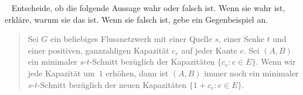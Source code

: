 \documentclass{uebung_cs}
\begin{document}
\begin{exercise}\
    Entscheide, ob die folgende Aussage wahr oder falsch ist. Wenn sie wahr ist, erkläre, warum sie das ist. Wenn sie falsch ist, gebe ein Gegenbeispiel an.
    \begin{quote}
        Sei $G$ ein beliebiges Flussnetzwerk mit einer Quelle $s$, einer Senke $t$ und einer positiven, ganzzahligen Kapazität $c_e$ auf jeder Kante $e$. Sei $(A,B)$ ein minimaler $s$-$t$-Schnitt bezüglich der Kapazitäten $\{c_e : e \in E\}$. Wenn wir jede Kapazität um~$1$ erhöhen, dann ist $(A,B)$ immer noch ein minimaler $s$-$t$-Schnitt bezüglich der neuen Kapazitäten $\{1 + c_e : e \in E\}$.
    \end{quote}
\end{exercise}
\end{document}
